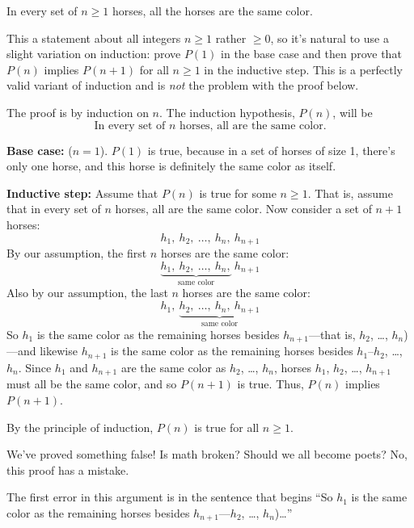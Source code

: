 \begin{falsethm}\label{horses}
In every set of $n \geq 1$ horses, all the horses are the same color.
\end{falsethm}

This a statement about all integers $n \geq 1$ rather $\geq 0$, so it's
natural to use a slight variation on induction: prove $P(1)$ in the base
case and then prove that $P(n)$ implies $P(n+1)$ for all $n \geq 1$ in the
inductive step.  This is a perfectly valid variant of induction and is
\emph{not} the problem with the proof below.

\begin{bogusproof}

The proof is by induction on $n$.  The induction hypothesis, $P(n)$, will be
\begin{equation}\label{horsehyp}
\text{In every set of $n$ horses, all are the same color.}
\end{equation}

\textbf{Base case:} ($n=1$).  $P(1)$ is true, because in a set of horses
of size 1, there's only one horse, and this horse is definitely the same
color as itself.

\textbf{Inductive step:} Assume that $P(n)$ is true for some $n \geq 1$.
That is, assume that in every set of $n$ horses, all are the same color.
Now consider a set of $n+1$ horses:
%
\[
h_1,\ h_2,\ \dots,\ h_n,\ h_{n+1}
\]
%
By our assumption, the first $n$ horses are the same color:
%
\[
\underbrace{h_1,\ h_2,\ \dots,\ h_n,}_{\text{same color}}\ h_{n+1}
\]
%
Also by our assumption, the last $n$ horses are the same color:
%
\[
h_1,\ \underbrace{h_2,\ \dots,\ h_n,\ h_{n+1}}_{\text{same color}}
\]
%
So $h_1$ is the same color as the remaining horses besides
$h_{n+1}$---that is, $h_2$, \ldots, $h_n$)---and likewise $h_{n+1}$ is
the same color as the remaining horses besides $h_1$--$h_2$, \ldots,
$h_n$.  Since $h_1$ and $h_{n+1}$ are the same color as $h_2$, \ldots,
$h_n$, horses $h_1$, $h_2$, \dots, $h_{n+1}$ must all be the same
color, and so $P(n+1)$ is true.  Thus, $P(n)$ implies $P(n+1)$.

By the principle of induction, $P(n)$ is true for all $n \geq 1$.
\end{bogusproof}
We've proved something false!  Is math broken?  Should we all become
poets?  No, this proof has a mistake.

The first error in this argument is in the sentence that begins ``So
$h_1$ is the same color as the remaining horses besides
$h_{n+1}$---$h_2$, \dots, $h_n$)\dots''

